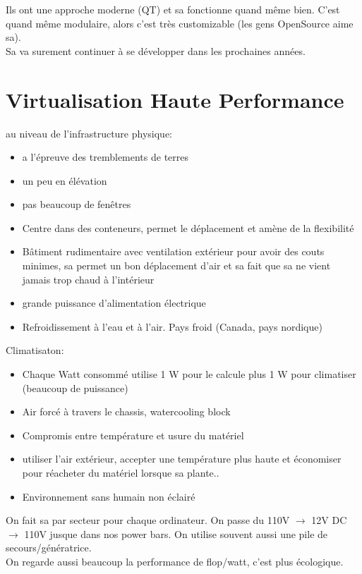 \documentclass[oneside]{book}
\begin{document}
Ils ont une approche moderne (QT) et sa fonctionne quand même bien. C'est quand même modulaire, alors c'est très customizable (les gens OpenSource aime sa). \\

Sa va surement continuer à se développer dans les prochaines années.
\chapter{Virtualisation Haute Performance}
au niveau de l'infrastructure physique:
\begin{itemize}
\item a l'épreuve des tremblements de terres
\item un peu en élévation
\item pas beaucoup de fenêtres
\item Centre dans des conteneurs, permet le déplacement et amène de la flexibilité
\item Bâtiment rudimentaire avec ventilation extérieur pour avoir des couts minimes, sa permet un bon déplacement d'air et sa fait que sa ne vient jamais trop chaud à l'intérieur
\item grande puissance d'alimentation électrique
\item Refroidissement à l'eau et à l'air. Pays froid (Canada, pays nordique)
\end{itemize}
Climatisaton:
\begin{itemize}
\item Chaque Watt consommé utilise 1 W pour le calcule plus 1 W pour climatiser (beaucoup de puissance)
\item Air forcé à travers le chassis, watercooling block
\item Compromis entre température et usure du matériel
\item utiliser l'air extérieur, accepter une température plus haute et économiser pour réacheter du matériel lorsque sa plante..
\item Environnement sans humain non éclairé
\end{itemize}

On fait sa par secteur pour chaque ordinateur. On passe du 110V $\rightarrow$ 12V DC $\rightarrow$ 110V jusque dans nos power bars. On utilise souvent aussi une pile de secours/génératrice. \\

On regarde aussi beaucoup la performance de flop/watt, c'est plus écologique.\\
\end{document}
